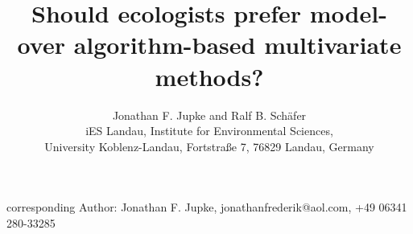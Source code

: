 \documentclass[a4paper,11pt]{article}
\begin{document}
\title{Should ecologists prefer model- over algorithm-based multivariate methods?}

\author{Jonathan F. Jupke and Ralf B. Schäfer \\ iES Landau, Institute for Environmental Sciences,\\ University Koblenz-Landau, Fortstraße 7, 76829 Landau, Germany}


    \maketitle
    corresponding Author: Jonathan F. Jupke, jonathanfrederik@aol.com,
    +49 06341 280-33285\\


    \newpage
\end{document}
